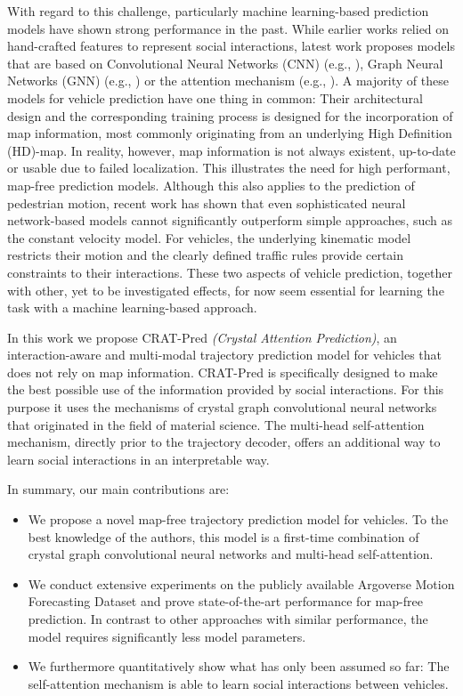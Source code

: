 \documentclass[letterpaper, 10 pt, conference]{ieeeconf}
\begin{document}
With regard to this challenge, particularly machine learning-based prediction models have shown strong performance in the past.
While earlier works relied on hand-crafted features to represent social interactions, latest work proposes models that are based on Convolutional Neural Networks (CNN) (e.g., \cite{Hong2019}), Graph Neural Networks (GNN) (e.g., \cite{Li2020a_ARXIV}) or the attention mechanism (e.g., \cite{Liang2020}).
A majority of these models for vehicle prediction have one thing in common:
Their architectural design and the corresponding training process is designed for the incorporation of map information, most commonly originating from an underlying High Definition (HD)-map.
In reality, however, map information is not always existent, up-to-date or usable due to failed localization.
This illustrates the need for high performant, map-free prediction models.
Although this also applies to the prediction of pedestrian motion, recent work \cite{Schoeller2020} has shown that even sophisticated neural network-based models cannot significantly outperform simple approaches, such as the constant velocity model.
For vehicles, the underlying kinematic model restricts their motion and the clearly defined traffic rules provide certain constraints to their interactions.
These two aspects of vehicle prediction, together with other, yet to be investigated effects, for now seem essential for learning the task with a machine learning-based approach.

In this work we propose CRAT-Pred \textit{(Crystal Attention Prediction)}, an interaction-aware and multi-modal trajectory prediction model for vehicles that does not rely on map information.
CRAT-Pred is specifically designed to make the best possible use of the information provided by social interactions.
For this purpose it uses the mechanisms of crystal graph convolutional neural networks \cite{Xie2018} that originated in the field of material science.
The multi-head self-attention mechanism, directly prior to the trajectory decoder, offers an additional way to learn social interactions in an interpretable way.

In summary, our main contributions are:
\begin{itemize}
	\item We propose a novel map-free trajectory prediction model for vehicles. To the best knowledge of the authors, this model is a first-time combination of crystal graph convolutional neural networks and multi-head self-attention.
	\item We conduct extensive experiments on the publicly available Argoverse Motion Forecasting Dataset \cite{Chang2019} and prove state-of-the-art performance for map-free prediction. In contrast to other approaches with similar performance, the model requires significantly less model parameters.
	\item We furthermore quantitatively show what has only been assumed so far: The self-attention mechanism is able to learn social interactions between vehicles.
\end{itemize}
\end{document}

